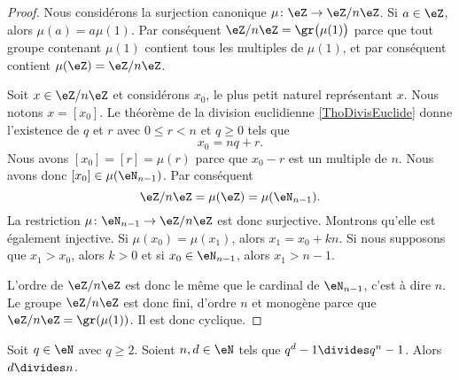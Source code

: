 \begin{proof}
    Nous considérons la surjection canonique \( \mu\colon \eZ\to \eZ/n\eZ\). Si \( a\in\eZ\), alors \( \mu(a)=a\mu(1)\). Par conséquent \( \eZ/n\eZ=\gr\big( \mu(1) \big)\) parce que tout groupe contenant \( \mu(1)\) contient tous les multiples de \( \mu(1)\), et par conséquent contient \( \mu(\eZ)=\eZ/n\eZ\).

    Soit \( x\in\eZ/n\eZ\) et considérons \( x_0\), le plus petit naturel représentant \( x\). Nous notons \( x=[x_0]\). Le théorème de la division euclidienne \ref{ThoDivisEuclide} donne l'existence de \( q\) et \( r\) avec \( 0\leq r<n\) et \( q\geq 0\) tels que
    \begin{equation}
        x_0=nq+r.
    \end{equation}
    Nous avons \( [x_0]=[r]=\mu(r)\) parce que \( x_0-r\) est un multiple de \( n\). Nous avons donc \( [x_0]\in\mu(\eN_{n-1})\). Par conséquent
    \begin{equation}
        \eZ/n\eZ=\mu(\eZ)=\mu(\eN_{n-1}).
    \end{equation}
    La restriction \( \mu\colon \eN_{n-1}\to \eZ/n\eZ\) est donc surjective. Montrons qu'elle est également injective. Si \( \mu(x_0)=\mu(x_1)\), alors \( x_1=x_0+kn\). Si nous supposons que \( x_1>x_0\), alors \( k>0\) et si \( x_0\in\eN_{n-1}\), alors \( x_1>n-1\).

    L'ordre de \( \eZ/n\eZ\) est donc le même que le cardinal de \( \eN_{n-1}\), c'est à dire \( n\). Le groupe \( \eZ/n\eZ\) est donc fini, d'ordre \( n\) et monogène parce que \( \eZ/n\eZ=\gr(\mu(1))\). Il est donc cyclique.
\end{proof}

\begin{lemma}
    Soit \( q\in \eN\) avec \( q\geq 2\). Soient \( n,d\in \eN\) tels que \( q^d-1\divides q^n-1\). Alors \( d\divides n\).
\end{lemma}

